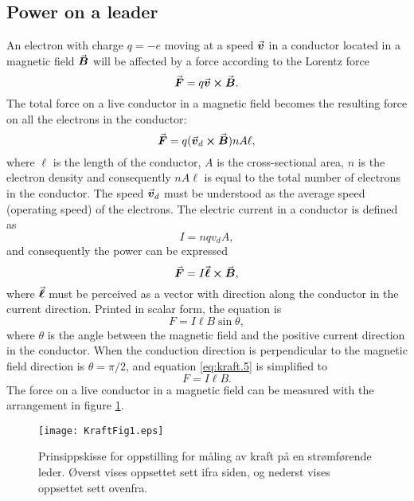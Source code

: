 \documentclass[../Elmag-labhefte-2020.tex]{subfiles}
\begin{document}
\subsection{Power on a leader \label{ch.kraft.beregn1}}
An electron with charge $q = -e$ moving at a speed $\va*{v}$ in a conductor located in a magnetic field $\va*{B}$ will be affected by a force according to the Lorentz force
\begin{equation}
    \va*{F} = q \va*{v} \cross \va*{B}.
\end{equation}
%
 The total force on a live conductor in a magnetic field becomes the resulting force on all the electrons in the conductor:
\begin{equation}
    \va*{F} = q (\va*{v}_d \cross \va*{B} ) n A \ell,
\end{equation}
%
where $\ell$ is the length of the conductor, $A$ is the cross-sectional area, $n$ is the electron density and consequently $n A \ell$ is equal to the total number of electrons in the conductor. The speed $\va*{v}_d$ must be understood as the average speed (operating speed) of the electrons.
The electric current in a conductor is defined as
\begin{equation}
    I = nqv_d A ,
\end{equation}
and consequently the power can be expressed
\begin{equation}
    \va*{F} = I\va*{\ell} \cross \va*{B},
\end{equation}
%
where $\va*{\ell}$ must be perceived as a vector with direction along the conductor in the current direction. Printed in scalar form, the equation is
\begin{equation}
    F = I\ell B \sin \theta,
    \label{eq:kraft.5}
\end{equation}
where $\theta$ is the angle between the magnetic field and the positive current direction in the conductor. When the conduction direction is perpendicular to the magnetic field direction is $\theta = \pi/2$, and equation \eqref{eq:kraft.5} is simplified to
\begin{equation}
    F = I\ell B.
    \label{eq:kraft.6}
\end{equation}
%
The force on a live conductor in a magnetic field can be measured with the arrangement in figure \ref{kraft.fig1}.
\begin{figure}[tbh]
    \centering
    \texttt{[image: KraftFig1.eps]}
    \caption{%
        Prinsippskisse for oppstilling for måling av kraft på en strømførende leder. Øverst vises oppsettet sett ifra siden, og nederst vises oppsettet sett ovenfra.
    }
    \label{kraft.fig1}
\end{figure}
\end{document}
